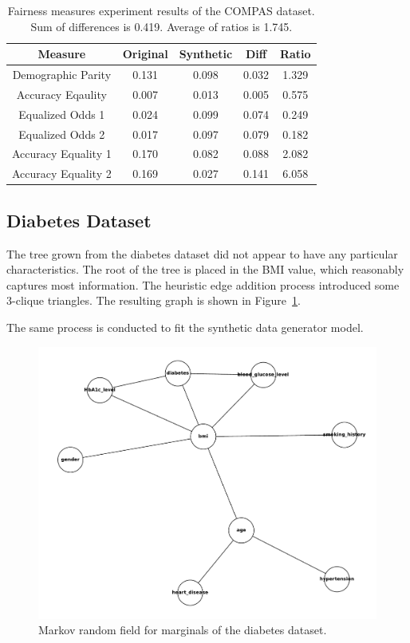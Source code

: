 \documentclass[manuscript,screen,review,anonymous]{acmart}
\begin{document}
\begin{table}[h]
\caption{Fairness measures experiment results of the COMPAS dataset. Sum of differences is 0.419. Average of ratios is 1.745.}
\label{tab:compas_score}
\begin{tabular}{ccccc}
\toprule
\textbf{Measure} & \textbf{Original} & \textbf{Synthetic} & \textbf{Diff} & \textbf{Ratio} \\
\midrule
Demographic Parity     & 0.131 & 0.098 & 0.032 & 1.329 \\
Accuracy Eqaulity      & 0.007 & 0.013 & 0.005 & 0.575 \\
Equalized Odds 1       & 0.024 & 0.099 & 0.074 & 0.249 \\
Equalized Odds 2       & 0.017 & 0.097 & 0.079 & 0.182 \\
Accuracy Equality 1    & 0.170 & 0.082 & 0.088 & 2.082 \\
Accuracy Equality 2    & 0.169 & 0.027 & 0.141 & 6.058 \\
\bottomrule
\end{tabular}
\end{table}

\subsection{Diabetes Dataset}

The tree grown from the diabetes dataset did not appear to have any particular characteristics. The root of the tree is placed in the BMI value, which reasonably captures most information. The heuristic edge addition process introduced some 3-clique triangles. The resulting graph is shown in Figure~\ref{fig:diabetes_mst}.

The same process is conducted to fit the synthetic data generator model.

\begin{figure}[h]
\centering
\includegraphics[width=\linewidth]{diabetes_mst}
\caption{Markov random field for marginals of the diabetes dataset.}
\label{fig:diabetes_mst}
\end{figure}
\end{document}
